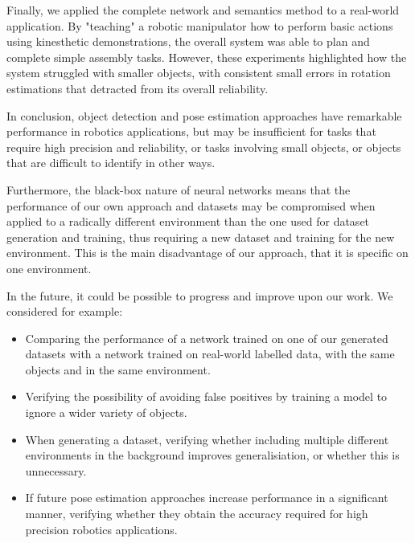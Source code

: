 Finally, we applied the complete network and semantics method to a real-world application. By "teaching" a robotic manipulator how to perform basic actions using kinesthetic demonstrations, the overall system was able to plan and complete simple assembly tasks. However, these experiments highlighted how the system struggled with smaller objects, with consistent small errors in rotation estimations that detracted from its overall reliability.

In conclusion, object detection and pose estimation approaches have remarkable performance in robotics applications, but may be insufficient for tasks that require high precision and reliability, or tasks involving small objects, or objects that are difficult to identify in other ways.

Furthermore, the black-box nature of neural networks means that the performance of our own approach and datasets may be compromised when applied to a radically different environment than the one used for dataset generation and training, thus requiring a new dataset and training for the new environment. This is the main disadvantage of our approach, that it is specific on one environment.

In the future, it could be possible to progress and improve upon our work. We considered for example:
\begin{itemize}
    \item Comparing the performance of a network trained on one of our generated datasets with a network trained on real-world labelled data, with the same objects and in the same environment.
    \item Verifying the possibility of avoiding false positives by training a model to ignore a wider variety of objects.
    \item When generating a dataset, verifying whether including multiple different environments in the background improves generalisiation, or whether this is unnecessary.
    \item If future pose estimation approaches increase performance in a significant manner, verifying whether they obtain the accuracy required for high precision robotics applications.
\end{itemize}
